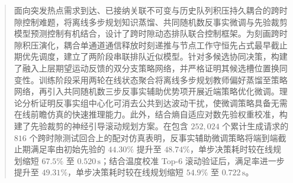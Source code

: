 \begin{abstract}
面向突发热点需求到达、已接纳关联不可变与历史队列积压持久耦合的跨时隙控制难题，将离线多步规划知识蒸馏、共同随机数反事实微调与先验裁剪模型预测控制有机结合，设计了跨时隙动态排队联合控制框架。为刻画跨时隙积压演化，耦合单通道通信释放时刻递推与节点工作守恒先占式最早截止期优先调度，建立了两阶段串联排队近似模型。针对多候选协同决策，构建了融入上层期望运动反馈的双分支策略网络，并严格证明其候选槽位置换同变性。训练阶段采用两轮在线状态聚合将离线多步规划教师偏好蒸馏至策略网络，再引入共同随机数三步反事实辅助优势项开展近端策略优化微调。理论分析证明反事实组中心化可消去公共到达波动干扰，使微调策略具备无需在线前瞻仿真的快速推理能力。此外，结合熵自适应对数先验权重校准，构建了先验裁剪的神经引导滚动规划方案。在包含 $252{,}024$ 个累计生成请求的 $816$ 个跨时隙测试回合上的配对仿真表明，反事实辅助微调策略将端到端截止期满足率由初始先验的 $44.30\%$ 提升至 $48.74\%$，单步决策耗时较在线规划缩短 $67.5\%$ 至 $0.520\,\mathrm{s}$；结合温度校准 Top-$6$ 滚动验证后，满足率进一步提升至 $49.31\%$，单步决策耗时较在线规划缩短 $54.9\%$ 至 $0.722\,\mathrm{s}$。
\end{abstract}

